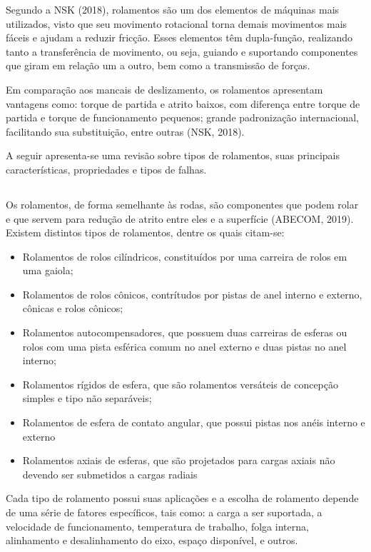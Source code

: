\documentclass[
	12pt,				
	oneside,			
	a4paper,			
	english,			
	brazil,			
	]{abntex2ppgsi}
\begin{document}
Segundo a NSK (2018), rolamentos são um dos elementos de máquinas mais utilizados, visto que seu movimento rotacional torna demais movimentos mais fáceis e ajudam a reduzir fricção. Esses elementos têm dupla-função, realizando tanto a transferência de movimento, ou seja, guiando e suportando componentes que giram em relação um a outro, bem como a transmissão de forças.

Em comparação aos mancais de deslizamento, os rolamentos apresentam vantagens como: torque de partida e atrito baixos, com diferença entre torque de partida e torque de funcionamento pequenos; grande padronização internacional, facilitando sua substituição, entre outras (NSK, 2018).

A seguir apresenta-se uma revisão sobre tipos de rolamentos, suas principais características, propriedades e tipos de falhas.

\subsection{}

Os rolamentos, de forma semelhante às rodas, são componentes que podem rolar  e que servem para redução de atrito entre eles e a superfície (ABECOM, 2019). Existem distintos tipos de rolamentos, dentre os quais citam-se:

\begin{itemize}
	\item Rolamentos de rolos cilíndricos, constituídos por uma carreira de rolos em uma gaiola;
	\item Rolamentos de rolos cônicos, contrítudos por pistas de anel interno e externo, cônicas e rolos cônicos;
	\item Rolamentos autocompensadores, que possuem duas carreiras de esferas ou rolos com uma pista esférica comum no anel externo e duas pistas no anel interno;
	\item Rolamentos rígidos de esfera, que são rolamentos versáteis de concepção simples e tipo não separáveis;
	\item Rolamentos de esfera de contato angular, que possui pistas nos anéis interno e externo
	\item Rolamentos axiais de esferas, que são projetados para cargas axiais não devendo ser submetidos a cargas radiais
\end{itemize}

Cada tipo de rolamento possui suas aplicações e a escolha de rolamento depende de uma série de fatores específicos, tais como: a carga a ser suportada, a velocidade de funcionamento, temperatura de trabalho, folga interna, alinhamento e desalinhamento do eixo, espaço disponível, e outros. 
\end{document}
